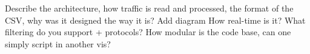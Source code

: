 {\color{red} Describe the architecture, how traffic is read and processed, the format of the CSV, why was it designed the way it is? Add diagram}
{\color{red} How real-time is it? What filtering do you support + protocols?}
{\color{red} How modular is the code base, can one simply script in another vis?}